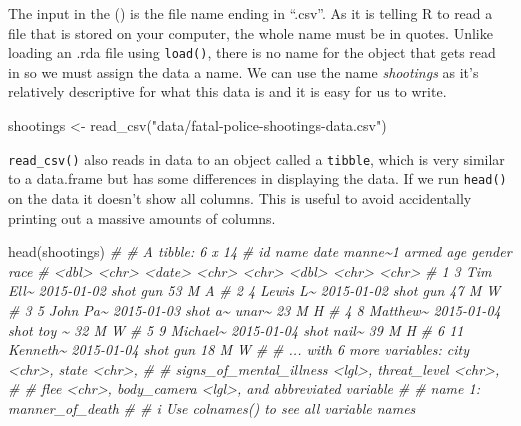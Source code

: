\documentclass[
  a4paper,
]{krantz}
\makeatletter
\newenvironment{Shaded}{\begin{snugshade}}{\end{snugshade}}
\newcommand{\CommentTok}[1]{\textcolor[rgb]{0.56,0.35,0.01}{\textit{#1}}}
\newcommand{\FunctionTok}[1]{\textcolor[rgb]{0.00,0.00,0.00}{#1}}
\newcommand{\NormalTok}[1]{#1}
\newcommand{\OtherTok}[1]{\textcolor[rgb]{0.56,0.35,0.01}{#1}}
\newcommand{\StringTok}[1]{\textcolor[rgb]{0.31,0.60,0.02}{#1}}
\newenvironment{kframe}{%
\medskip{}
\setlength{\fboxsep}{.8em}
 \def\at@end@of@kframe{}%
 \ifinner\ifhmode%
  \def\at@end@of@kframe{\end{minipage}}%
  \begin{minipage}{\columnwidth}%
 \fi\fi%
 \def\FrameCommand##1{\hskip\@totalleftmargin \hskip-\fboxsep
 \colorbox{shadecolor}{##1}\hskip-\fboxsep
     \hskip-\linewidth \hskip-\@totalleftmargin \hskip\columnwidth}%
 \MakeFramed {\advance\hsize-\width
   \@totalleftmargin\z@ \linewidth\hsize
   \@setminipage}}%
 {\par\unskip\endMakeFramed%
 \at@end@of@kframe}
\renewenvironment{Shaded}{\begin{kframe}}{\end{kframe}}
\makeatother
\begin{document}
The input in the () is the file name ending in ``.csv''. As
it is telling R to read a file that is stored on your
computer, the whole name must be in quotes. Unlike loading
an .rda file using \texttt{load()}, there is no name for the
object that gets read in so we must assign the data a name.
We can use the name \emph{shootings} as it's relatively
descriptive for what this data is and it is easy for us to
write.

\begin{Shaded}
\begin{Highlighting}[]
\NormalTok{shootings }\OtherTok{\textless{}{-}} \FunctionTok{read\_csv}\NormalTok{(}\StringTok{"data/fatal{-}police{-}shootings{-}data.csv"}\NormalTok{)}
\end{Highlighting}
\end{Shaded}

\texttt{read\_csv()} also reads in data to an object called
a \texttt{tibble}, which is very similar to a data.frame but
has some differences in displaying the data. If we run
\texttt{head()} on the data it doesn't show all columns.
This is useful to avoid accidentally printing out a massive
amounts of columns.

\begin{Shaded}
\begin{Highlighting}[]
\FunctionTok{head}\NormalTok{(shootings)}
\CommentTok{\# \# A tibble: 6 x 14}
\CommentTok{\#      id name     date       manne\textasciitilde{}1 armed   age gender race }
\CommentTok{\#   \textless{}dbl\textgreater{} \textless{}chr\textgreater{}    \textless{}date\textgreater{}     \textless{}chr\textgreater{}   \textless{}chr\textgreater{} \textless{}dbl\textgreater{} \textless{}chr\textgreater{}  \textless{}chr\textgreater{}}
\CommentTok{\# 1     3 Tim Ell\textasciitilde{} 2015{-}01{-}02 shot    gun      53 M      A    }
\CommentTok{\# 2     4 Lewis L\textasciitilde{} 2015{-}01{-}02 shot    gun      47 M      W    }
\CommentTok{\# 3     5 John Pa\textasciitilde{} 2015{-}01{-}03 shot a\textasciitilde{} unar\textasciitilde{}    23 M      H    }
\CommentTok{\# 4     8 Matthew\textasciitilde{} 2015{-}01{-}04 shot    toy \textasciitilde{}    32 M      W    }
\CommentTok{\# 5     9 Michael\textasciitilde{} 2015{-}01{-}04 shot    nail\textasciitilde{}    39 M      H    }
\CommentTok{\# 6    11 Kenneth\textasciitilde{} 2015{-}01{-}04 shot    gun      18 M      W    }
\CommentTok{\# \# ... with 6 more variables: city \textless{}chr\textgreater{}, state \textless{}chr\textgreater{},}
\CommentTok{\# \#   signs\_of\_mental\_illness \textless{}lgl\textgreater{}, threat\_level \textless{}chr\textgreater{},}
\CommentTok{\# \#   flee \textless{}chr\textgreater{}, body\_camera \textless{}lgl\textgreater{}, and abbreviated variable}
\CommentTok{\# \#   name 1: manner\_of\_death}
\CommentTok{\# \# i Use \textasciigrave{}colnames()\textasciigrave{} to see all variable names}
\end{Highlighting}
\end{Shaded}
\end{document}

